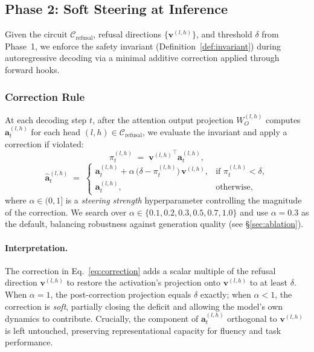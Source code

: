 \documentclass[11pt]{article}
\begin{document}
\subsection{Phase 2: Soft Steering at Inference}
\label{subsec:steering}

Given the circuit $\mathcal{C}_{\mathrm{refusal}}$, refusal directions $\{\mathbf{v}^{(l,h)}\}$, and threshold $\delta$ from Phase~1, we enforce the safety invariant (Definition~\ref{def:invariant}) during autoregressive decoding via a minimal additive correction applied through forward hooks.

\subsubsection{Correction Rule}
\label{subsubsec:correction}

At each decoding step $t$, after the attention output projection $W_O^{(l,h)}$ computes $\mathbf{a}^{(l,h)}_t$ for each head $(l,h)\in\mathcal{C}_{\mathrm{refusal}}$, we evaluate the invariant and apply a correction if violated:
\begin{equation}
\label{eq:projection_scalar}
\pi_t^{(l,h)} \;=\; {\mathbf{v}^{(l,h)}}^\top\!\mathbf{a}_t^{(l,h)},
\end{equation}
\begin{equation}
\label{eq:correction}
\hat{\mathbf{a}}_t^{(l,h)} \;=\;
\begin{cases}
\mathbf{a}_t^{(l,h)} + \alpha\,\big(\delta - \pi_t^{(l,h)}\big)\,\mathbf{v}^{(l,h)}, & \text{if } \pi_t^{(l,h)} < \delta, \\[4pt]
\mathbf{a}_t^{(l,h)}, & \text{otherwise},
\end{cases}
\end{equation}
where $\alpha\in(0,1]$ is a \emph{steering strength} hyperparameter controlling the magnitude of the correction. We search over $\alpha\in\{0.1,0.2,0.3,0.5,0.7,1.0\}$ and use $\alpha{=}0.3$ as the default, balancing robustness against generation quality (see \S\ref{sec:ablation}).

\paragraph{Interpretation.} The correction in Eq.~\ref{eq:correction} adds a scalar multiple of the refusal direction $\mathbf{v}^{(l,h)}$ to restore the activation's projection onto $\mathbf{v}^{(l,h)}$ to at least $\delta$. When $\alpha{=}1$, the post-correction projection equals $\delta$ exactly; when $\alpha{<}1$, the correction is \emph{soft}, partially closing the deficit and allowing the model's own dynamics to contribute. Crucially, the component of $\mathbf{a}_t^{(l,h)}$ orthogonal to $\mathbf{v}^{(l,h)}$ is left untouched, preserving representational capacity for fluency and task performance.
\end{document}
